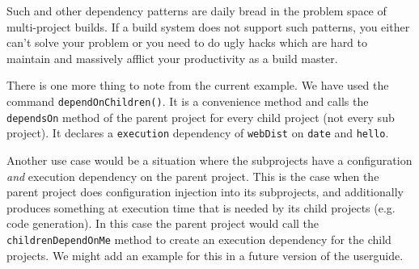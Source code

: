 Such and other dependency patterns are daily bread in the problem space of multi-project builds. If a build system does not support such patterns, you either can't solve your problem or you need to do ugly hacks which are hard to maintain and massively afflict your productivity as a build master.

There is one more thing to note from the current example. We have used the command \texttt{dependOnChildren()}. It is a convenience method and calls the \texttt{dependsOn} method of the parent project for every child project (not every sub project). It declares a \texttt{execution} dependency of \texttt{webDist} on \texttt{date} and \texttt{hello}.

Another use case would be a situation where the subprojects have a configuration \emph{and} execution dependency on the parent project. This is the case when the parent project does configuration injection into its subprojects, and additionally produces something at execution time that is needed by its child projects (e.g. code generation). In this case the parent project would call the \texttt{childrenDependOnMe} method to create an execution dependency for the child projects. We might add an example for this in a future version of the userguide.

